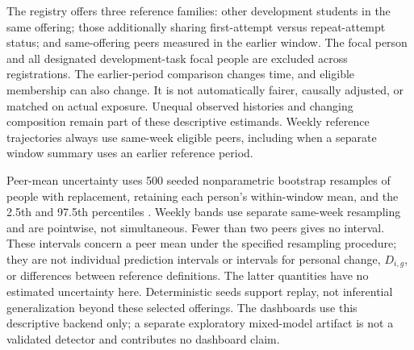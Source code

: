 The registry offers three reference families: other development students in the same offering; those additionally sharing first-attempt versus repeat-attempt status; and same-offering peers measured in the earlier window. The focal person and all designated development-task focal people are excluded across registrations. The earlier-period comparison changes time, and eligible membership can also change. It is not automatically fairer, causally adjusted, or matched on actual exposure. Unequal observed histories and changing composition remain part of these descriptive estimands. Weekly reference trajectories always use same-week eligible peers, including when a separate window summary uses an earlier reference period.

Peer-mean uncertainty uses 500 seeded nonparametric bootstrap resamples of people with replacement, retaining each person's within-window mean, and the 2.5th and 97.5th percentiles \cite{efron}. Weekly bands use separate same-week resampling and are pointwise, not simultaneous. Fewer than two peers gives no interval. These intervals concern a peer mean under the specified resampling procedure; they are not individual prediction intervals or intervals for personal change, $D_{i,g}$, or differences between reference definitions. The latter quantities have no estimated uncertainty here. Deterministic seeds support replay, not inferential generalization beyond these selected offerings. The dashboards use this descriptive backend only; a separate exploratory mixed-model artifact is not a validated detector and contributes no dashboard claim.
